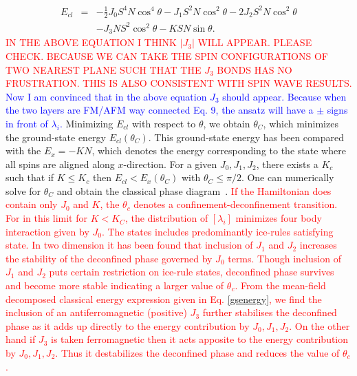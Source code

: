 \begin{eqnarray}
\label{gsenergy}
E_{cl}&=&- \frac{1}{2}J_0S^4N\cos^4\theta - J_1S^2N\cos^2\theta - 2J_2S^2N\cos^2\theta \nonumber\\
&& - J_3 N S^2 \cos^2\theta - KSN \sin \theta .
\end{eqnarray}
\textcolor{red}{IN THE ABOVE EQUATION I THINK $|J_3|$ WILL APPEAR. PLEASE CHECK. BECAUSE WE CAN TAKE THE SPIN CONFIGURATIONS OF TWO NEAREST PLANE SUCH THAT THE $J_3$ BONDS HAS NO FRUSTRATION. THIS IS ALSO CONSISTENT WITH SPIN WAVE RESULTS.}
\textcolor{blue}{Now I am convinced that in the above equation $J_3$ should appear. Because when the two layers are FM/AFM way connected Eq. 9, the ansatz will have a $\pm$ signs in front of $\lambda_i$.}
\indent Minimizing $E_{cl}$ with respect to $\theta$, we obtain $\theta_C$, which minimizes the ground-state energy $E_{cl}(\theta_C)$. This ground-state energy has been compared with the $E_x=-KN$, which denotes the energy corresponding to the state where all spins are aligned along $x$-direction. For a given $J_0,J_1,J_2$, there exists a $K_c$ such that if $K\le K_c$ then $E_{cl}<E_x(\theta_C)$ with $\theta_C\le \pi/2$. One can numerically solve for $\theta_C$ and obtain the classical phase diagram~\cite{vijigiri2018classical}. \textcolor{red} {If the Hamiltonian does contain only $J_0$ and $K$, the $\theta_c$ denotes a confinement-deconfinement transition. For in this limit for $K < K_C$, the distribution of $[\lambda_i]$ minimizes four body interaction given by $J_0$. The states includes predominantly ice-rules satisfying state. In two dimension it has been found that inclusion of $J_1$ and $J_2$ increases the stability of the   deconfined phase governed by $J_0$ terms. Though inclusion of $J_1$ and $J_2$  puts certain restriction on ice-rule states, deconfined phase survives and become more stable indicating a larger value of $\theta_c$. From the mean-field decomposed classical energy expression given in Eq. \ref{gsenergy}, we find the inclusion of an antiferromagnetic (positive) $J_3$ further stabilises the deconfined phase as it adds up  directly to
the energy contribution by $J_0, J_1, J_2$.  On the other hand if $J_3$ is taken ferromagnetic then it acts apposite to the energy contribution  by $J_0, J_1, J_2$. Thus it destabilizes the deconfined phase and reduces the value of $\theta_c$.}  \\
